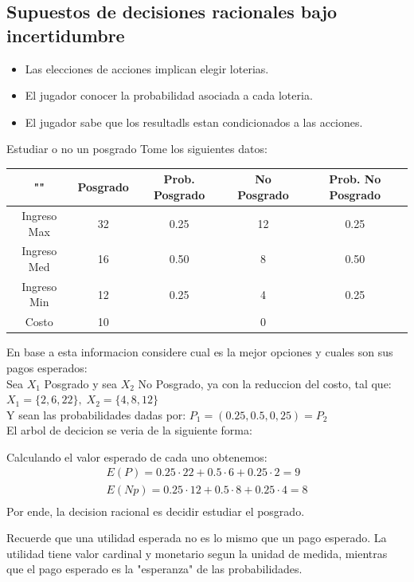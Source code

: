 \documentclass[12pt]{article}
\begin{document}
\subsection{Supuestos de decisiones racionales bajo incertidumbre}
\begin{itemize}
    \item Las elecciones de acciones implican elegir loterias. 
    \item El jugador conocer la probabilidad asociada a cada loteria. 
    \item El jugador sabe que los resultadls estan condicionados a las acciones. 
\end{itemize}

\begin{ejemplo}{Estudiar o no un posgrado}
Tome los siguientes datos: 
    \begin{center}
            \begin{tabular}{|c|c|c|c|c|}
                \hline
                "" & Posgrado & Prob. Posgrado & No Posgrado & Prob. No Posgrado \\
                \hline
                Ingreso Max & 32 & 0.25 & 12 & 0.25  \\ \hline
                Ingreso Med & 16 & 0.50 & 8 & 0.50 \\ \hline
                Ingreso Min & 12 & 0.25 & 4 & 0.25 \\ \hline
                Costo       & 10 &  & 0 &  \\ 
                \hline
            \end{tabular}
    \end{center}
En base a esta informacion considere cual es la mejor opciones y cuales son sus pagos esperados: \\
Sea $X_1$ Posgrado y sea $X_2$ No Posgrado, ya con la reduccion del costo, tal que: \\ 
$X_1=\{2,6,22\},\; X_2=\{4,8,12\}$\\ 
Y sean las probabilidades dadas por: $P_1=(0.25,0.5,0,25)=P_2$\\
El arbol de decicion se veria de la siguiente forma: 
    \begin{figure} [H]
        \centering
        
        \label{fig:placeholder}
    \end{figure}
Calculando el valor esperado de cada uno obtenemos: 
\begin{align*}
    E(P)=0.25 \cdot 22 + 0.5 \cdot 6 + 0.25 \cdot 2= 9 \\
    E(Np)=0.25 \cdot 12 + 0.5 \cdot 8 + 0.25 \cdot 4= 8 \\
\end{align*}
Por ende, la decision racional es decidir estudiar el posgrado. 
\end{ejemplo}
\begin{importante}
    Recuerde que una utilidad esperada no es lo mismo que un pago esperado. La utilidad tiene valor cardinal y monetario segun la unidad de medida, mientras que el pago esperado es la "esperanza" de las probabilidades. 
\end{importante}
\end{document}
